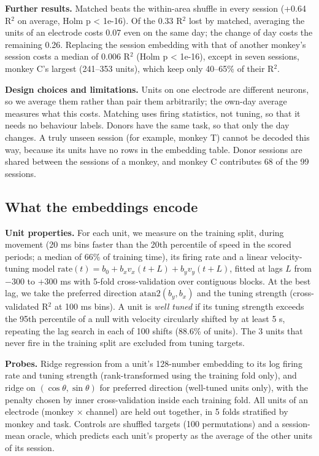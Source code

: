 \documentclass[11pt]{article}
\begin{document}
\textbf{Further results.} Matched beats the within-area shuffle in every session (+0.64 R$^{2}$ on average, Holm p < 1e-16). Of the 0.33 R$^{2}$ lost by matched, averaging the units of an electrode costs 0.07 even on the same day; the change of day costs the remaining 0.26. Replacing the session embedding with that of another monkey's session costs a median of 0.006 R$^{2}$ (Holm p < 1e-16), except in seven sessions, monkey C's largest (241--353 units), which keep only 40--65\% of their R$^{2}$.

\textbf{Design choices and limitations.} Units on one electrode are different neurons, so we average them rather than pair them arbitrarily; the own-day average measures what this costs. Matching uses firing statistics, not tuning, so that it needs no behaviour labels. Donors have the same task, so that only the day changes. A truly unseen session (for example, monkey T) cannot be decoded this way, because its units have no rows in the embedding table. Donor sessions are shared between the sessions of a monkey, and monkey C contributes 68 of the 99 sessions.

\subsection{What the embeddings encode}

\textbf{Unit properties.} For each unit, we measure on the training split, during movement (20 ms bins faster than the 20th percentile of speed in the scored periods; a median of 66\% of training time), its firing rate and a linear velocity-tuning model $\text{rate}(t) = b_0 + b_x v_x(t + L) + b_y v_y(t + L)$, fitted at lags $L$ from $-$300 to +300 ms with 5-fold cross-validation over contiguous blocks. At the best lag, we take the preferred direction $\mathrm{atan2}(b_y, b_x)$ and the tuning strength (cross-validated R$^{2}$ at 100 ms bins). A unit is \emph{well tuned} if its tuning strength exceeds the 95th percentile of a null with velocity circularly shifted by at least 5 s, repeating the lag search in each of 100 shifts (88.6\% of units). The 3 units that never fire in the training split are excluded from tuning targets.

\textbf{Probes.} Ridge regression from a unit's 128-number embedding to its log firing rate and tuning strength (rank-transformed using the training fold only), and ridge on $(\cos\theta, \sin\theta)$ for preferred direction (well-tuned units only), with the penalty chosen by inner cross-validation inside each training fold. All units of an electrode (monkey $\times$ channel) are held out together, in 5 folds stratified by monkey and task. Controls are shuffled targets (100 permutations) and a session-mean oracle, which predicts each unit's property as the average of the other units of its session.
\end{document}
